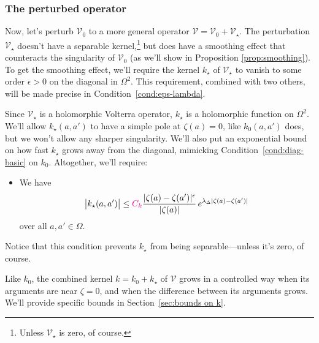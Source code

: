 \documentclass{article}
\makeatletter
\theoremstyle{plain}
\newcommand{\condconst}[2]{\item[($\text{\textsc{#1}} \mid #2$)]\protected@edef\@currentlabel{$\text{\textsc{#1}} \mid #2$}}
\newcommand{\volterra}{\mathcal{V}}
\newcommand{\hardpart}{\mathcal{V}_0}
\newcommand{\softpart}{\mathcal{V}_\star}
\newcommand{\hardker}{k_0}
\newcommand{\softker}{k_\star}
\newcommand{\domain}{\Omega}
\makeatother
\begin{document}
\subsubsection{The perturbed operator}\label{setting:perturbed}

Now, let's perturb $\hardpart$ to a more general operator $\volterra=\hardpart +\softpart$. The perturbation $\softpart$ doesn't have a separable kernel,\footnote{Unless $\softpart$ is zero, of course.} but does have a smoothing effect that counteracts the singularity of $\hardpart$ (as we'll show in Proposition \ref{prop:smoothing}). To get the smoothing effect, we'll require the kernel $\softker$ of $\softpart$ to vanish to some order $\epsilon > 0$ on the diagonal in $\Omega^2$. This requirement, combined with two others, will be made precise in Condition~\eqref{cond:eps-lambda}.

Since $\softpart$ is a holomorphic Volterra operator, $\softker$ is a holomorphic function on $\domain^2$. We'll allow $\softker(a, a')$ to have a simple pole at $\zeta(a) = 0$, like $\hardker(a, a')$ does, but we won't allow any sharper singularity. We'll also put an exponential bound on how fast $\softker$ grows away from the diagonal, mimicking Condition~\eqref{cond:diag-basic} on $\hardker$. Altogether, we'll require:
\begin{itemize}
\condconst{diag$_\star$}{\epsilon, \lambda_\Delta}\label{cond:eps-lambda} We have
\[ \big| \softker(a, a') \big| \leq \textcolor{magenta}{C_k}\frac{|\zeta(a)-\zeta(a')|^\epsilon}{|\zeta(a)|}\,e^{\lambda_\Delta|\zeta(a)-\zeta(a')|}\]
over all $a, a' \in \domain$.
\end{itemize}
Notice that this condition prevents $\softker$ from being separable---unless it's zero, of course.

Like $\hardker$, the combined kernel $k = \hardker + \softker$ of $\volterra$ grows in a controlled way when its arguments are near $\zeta = 0$, and when the difference between its arguments grows. We'll provide specific bounds in Section~\ref{sec:bounds on k}. 
\end{document}

